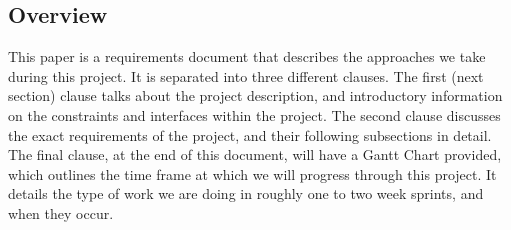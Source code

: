 \documentclass[letterpaper,10pt,titlepage,draftclsnofoot,onecolumn,compsoc,utf8,latin1]{IEEEtran}
\begin{document}
\subsection{Overview}
\begin{singlespace}
\noindent
This paper is a requirements document that describes the approaches we take during this project. It is separated into three different clauses. The first (next section) clause talks about the project description, and introductory information on the constraints and interfaces within the project. The second clause discusses the exact requirements of the project, and their following subsections in detail. The final clause, at the end of this document, will have a Gantt Chart provided, which outlines the time frame at which we will progress through this project. It details the type of work we are doing in roughly one to two week sprints, and when they occur.
\end{singlespace}
\end{document}
